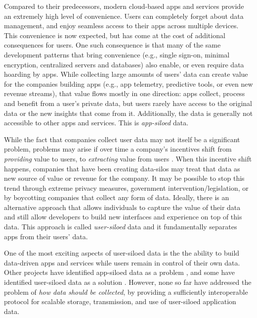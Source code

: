 \documentclass{textile}
\begin{document}
Compared to their predecessors, modern cloud-based apps and services provide an extremely high level of convenience. Users can completely forget about data management, and enjoy seamless access to their apps across multiple devices. This convenience is now expected, but has come at the cost of additional consequences for users. One such consequence is that many of the same development patterns that bring convenience (e.g., single sign-on, minimal encryption, centralized servers and databases) also enable, or even require data hoarding by apps. While collecting large amounts of users' data can create value for the companies building apps (e.g., app telemetry, predictive tools, or even new revenue streams), that value flows mostly in one direction: apps collect, process and benefit from a user's private data, but users rarely have access to the original data or the new insights that come from it. Additionally, the data is generally not accessible to other apps and services. This is \emph{app-siloed} data.

While the fact that companies collect user data may not itself be a significant problem, problems may arise if over time a company's incentives shift from \emph{providing} value to users, to \emph{extracting} value from users \cite{dixonWhyDecentralizationMatters2018}. When this incentive shift happens, companies that have been creating data-silos may treat that data as new source of value or revenue for the company. It may be possible to stop this trend through extreme privacy measures, government intervention/legislation, or by boycotting companies that collect any form of data. Ideally, there is an alternative approach that allows individuals to capture the value of their data and still allow developers to build new interfaces and experience on top of this data. This approach is called \emph{user-siloed} data and it fundamentally separates apps from their users' data.

One of the most exciting aspects of user-siloed data is the the ability to build data-driven apps and services while users remain in control of their own data. Other projects have identified app-siloed data as a problem \cite{bernersLee_readwrite_2013,de_montjoye_trusted_2012}, and some have identified user-siloed data as a solution \cite{sambraSolidPlatformDecentralized2016}. However, none so far have addressed the problem of \emph{how data should be collected}, by providing a sufficiently interoperable protocol for scalable storage, transmission, and use of user-siloed application data.
\end{document}
